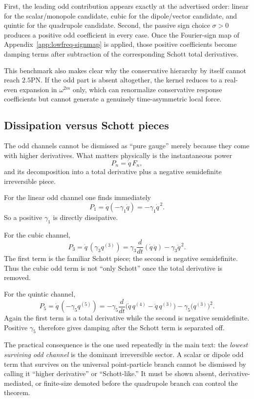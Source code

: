 \documentclass[11pt]{article}
\begin{document}
First, the leading odd contribution appears exactly at the advertised order:
linear for the scalar/monopole candidate, cubic for the dipole/vector
candidate, and quintic for the quadrupole candidate.  Second, the passive sign
choice $\sigma>0$ produces a positive odd coefficient in every case.  Once the
Fourier-sign map of Appendix~\ref{app:lowfreq-signmap} is applied, those
positive coefficients become damping terms after subtraction of the corresponding
Schott total derivatives.

This benchmark also makes clear why the conservative hierarchy by itself cannot
reach $2.5$PN.  If the odd part is absent altogether, the kernel reduces to a
real-even expansion in $\omega^{2m}$ only, which can renormalize conservative
response coefficients but cannot generate a genuinely time-asymmetric local
force.

\subsection{Dissipation versus Schott pieces}
\label{app:lowfreq-schott}

The odd channels cannot be dismissed as ``pure gauge'' merely because they come
with higher derivatives.  What matters physically is the instantaneous power
\[
P_n=\dot q\,F_n,
\]
and its decomposition into a total derivative plus a negative semidefinite
irreversible piece.

For the linear odd channel one finds immediately
\[
P_1
=
\dot q(-\gamma_1\dot q)
=
-\gamma_1\dot q^{\,2}.
\]
So a positive $\gamma_1$ is directly dissipative.

For the cubic channel,
\[
P_3
=
\dot q\,(\gamma_3 q^{(3)})
=
\gamma_3\frac{d}{dt}(\dot q\,\ddot q)-\gamma_3\ddot q^{\,2}.
\]
The first term is the familiar Schott piece; the second is negative
semidefinite.  Thus the cubic odd term is not ``only Schott'' once the total
 derivative is removed.

For the quintic channel,
\[
P_5
=
\dot q\,(-\gamma_5 q^{(5)})
=
-\gamma_5\frac{d}{dt}\bigl(\dot q\,q^{(4)}-\ddot q\,q^{(3)}\bigr)
-\gamma_5\bigl(q^{(3)}\bigr)^2.
\]
Again the first term is a total derivative while the second is negative
semidefinite.  Positive $\gamma_5$ therefore gives damping after the Schott term
is separated off.

The practical consequence is the one used repeatedly in the main text: the
\emph{lowest surviving odd channel} is the dominant irreversible sector.  A
scalar or dipole odd term that survives on the universal point-particle branch
cannot be dismissed by calling it ``higher derivative'' or ``Schott-like.''  It
must be shown absent, derivative-mediated, or finite-size demoted before the
quadrupole branch can control the theorem.
\end{document}
